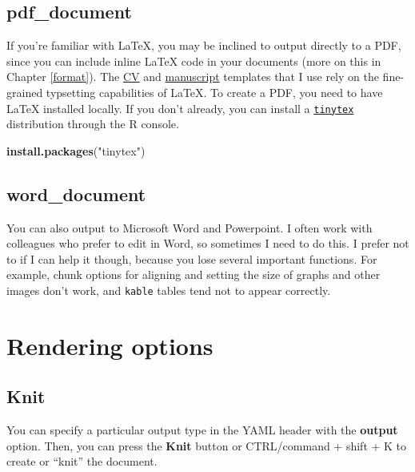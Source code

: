 \documentclass[
  openany]{book}
\newenvironment{Shaded}{\begin{snugshade}}{\end{snugshade}}
\newcommand{\KeywordTok}[1]{\textcolor[rgb]{0.13,0.29,0.53}{\textbf{#1}}}
\newcommand{\NormalTok}[1]{#1}
\newcommand{\StringTok}[1]{\textcolor[rgb]{0.31,0.60,0.02}{#1}}
\begin{document}
\hypertarget{pdf_document}{%
\subsection{pdf\_document}\label{pdf_document}}

If you're familiar with LaTeX, you may be inclined to output directly to a PDF, since you can include inline LaTeX code in your documents (more on this in Chapter \ref{format}). The \href{https://github.com/mitchelloharawild/vitae}{CV} and \href{https://github.com/rosannav/thesis_in_rmarkdown/tree/master/example_thesis}{manuscript} templates that I use rely on the fine-grained typsetting capabilities of LaTeX. To create a PDF, you need to have LaTeX installed locally. If you don't already, you can install a \href{https://yihui.org/tinytex/}{\texttt{tinytex}} distribution through the R console.

\begin{Shaded}
\begin{Highlighting}[]
\KeywordTok{install.packages}\NormalTok{(}\StringTok{"tinytex"}\NormalTok{)}
\end{Highlighting}
\end{Shaded}

\hypertarget{word_document}{%
\subsection{word\_document}\label{word_document}}

You can also output to Microsoft Word and Powerpoint. I often work with colleagues who prefer to edit in Word, so sometimes I need to do this. I prefer not to if I can help it though, because you lose several important functions. For example, chunk options for aligning and setting the size of graphs and other images don't work, and \texttt{kable} tables tend not to appear correctly.

\hypertarget{rendering-options}{%
\section{Rendering options}\label{rendering-options}}

\hypertarget{knit}{%
\subsection{Knit}\label{knit}}

You can specify a particular output type in the YAML header with the \textbf{output} option. Then, you can press the \textbf{Knit} button or CTRL/command + shift + K to create or ``knit'' the document.
\end{document}
